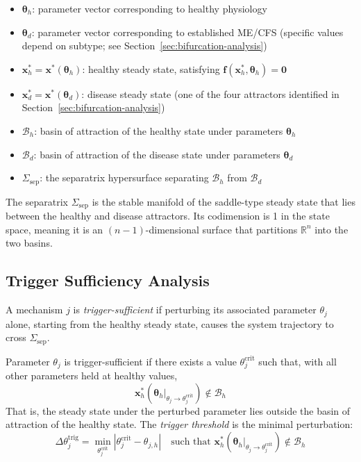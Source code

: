 \begin{itemize}
    \item $\boldsymbol{\theta}_h$: parameter vector corresponding to healthy physiology
    \item $\boldsymbol{\theta}_d$: parameter vector corresponding to established ME/CFS (specific values depend on subtype; see Section~\ref{sec:bifurcation-analysis})
    \item $\mathbf{x}_h^* = \mathbf{x}^*(\boldsymbol{\theta}_h)$: healthy steady state, satisfying $\mathbf{f}(\mathbf{x}_h^*, \boldsymbol{\theta}_h) = \mathbf{0}$
    \item $\mathbf{x}_d^* = \mathbf{x}^*(\boldsymbol{\theta}_d)$: disease steady state (one of the four attractors identified in Section~\ref{sec:bifurcation-analysis})
    \item $\mathcal{B}_h$: basin of attraction of the healthy state under parameters $\boldsymbol{\theta}_h$
    \item $\mathcal{B}_d$: basin of attraction of the disease state under parameters $\boldsymbol{\theta}_d$
    \item $\Sigma_{\mathrm{sep}}$: the separatrix hypersurface separating $\mathcal{B}_h$ from $\mathcal{B}_d$
\end{itemize}

The separatrix $\Sigma_{\mathrm{sep}}$ is the stable manifold of the saddle-type steady state that lies between the healthy and disease attractors. Its codimension is 1 in the state space, meaning it is an $(n-1)$-dimensional surface that partitions $\mathbb{R}^{n}$ into the two basins.

\subsection{Trigger Sufficiency Analysis}
\label{sec:trigger-sufficiency-method}

A mechanism $j$ is \emph{trigger-sufficient} if perturbing its associated parameter $\theta_j$ alone, starting from the healthy steady state, causes the system trajectory to cross $\Sigma_{\mathrm{sep}}$.

\begin{definition}
\label{def:trigger-sufficient}
Parameter $\theta_j$ is trigger-sufficient if there exists a value $\theta_j^{\mathrm{crit}}$ such that, with all other parameters held at healthy values,
\begin{equation}
\label{eq:trigger-sufficiency}
\mathbf{x}_h^*(\boldsymbol{\theta}_h|_{\theta_j \to \theta_j^{\mathrm{crit}}}) \notin \mathcal{B}_h
\end{equation}
That is, the steady state under the perturbed parameter lies outside the basin of attraction of the healthy state. The \emph{trigger threshold} is the minimal perturbation:
\begin{equation}
\label{eq:trigger-threshold}
\Delta\theta_j^{\mathrm{trig}} = \min_{\theta_j^{\mathrm{crit}}} |\theta_j^{\mathrm{crit}} - \theta_{j,h}| \quad \text{such that } \mathbf{x}_h^*(\boldsymbol{\theta}_h|_{\theta_j \to \theta_j^{\mathrm{crit}}}) \notin \mathcal{B}_h
\end{equation}
\end{definition}

